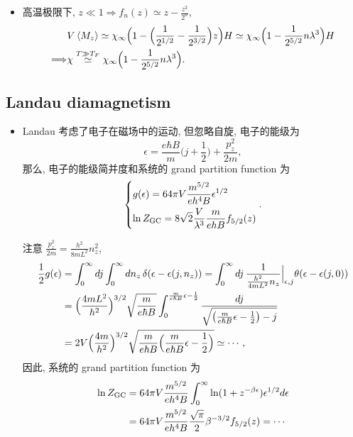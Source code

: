 \begin{itemize}
\begin{itemize}
		\item 高温极限下, $z \ll 1 \Longrightarrow f_n(z) \simeq z - \frac{z^2}{2^n}$,
		\begin{align}
			& V \braket{M_z} \simeq \chi_\infty \Big( 1 - \Big( \frac{1}{2^{1 / 2}} - \frac{1}{2^{3 / 2}} \Big) z \Big) H \simeq \chi_\infty \Big( 1 - \frac{1}{2^{5 / 2}} n \lambda^3 \Big) H \notag \\
			\Longrightarrow & \chi \overset{T \gg T_F}{\simeq} \chi_\infty \Big( 1 - \frac{1}{2^{5 / 2}} n \lambda^3 \Big).
		\end{align}
	\end{itemize}
\end{itemize}

\subsection{Landau diamagnetism}
\begin{itemize}
	\item Landau 考虑了电子在磁场中的运动, 但忽略自旋, 电子的能级为
	\begin{equation}
		\epsilon = \frac{e \hbar B}{m} \Big( j + \frac{1}{2} \Big) + \frac{p_z^2}{2 m},
	\end{equation}
	那么, 电子的能级简并度和系统的 grand partition function 为
	\begin{equation}
		\begin{dcases}
			g(\epsilon) = 64 \pi V \frac{m^{5 / 2}}{e h^4 B} \epsilon^{1 / 2} \\
			\ln Z_\text{GC} = 8 \sqrt{2} \frac{V}{\lambda^3} \frac{m}{e h B} f_{5 / 2}(z)
		\end{dcases}.
	\end{equation}
	
	\begin{tcolorbox}[title=calculation:]
		注意 $\frac{p_z^2}{2 m} = \frac{h^2}{8 m L^2} n_z^2$,
		\begin{align}
			\frac{1}{2} g(\epsilon) &= \int_0^\infty dj \int_0^\infty dn_z \, \delta(\epsilon - \epsilon(j, n_z)) = \int_0^\infty dj \, \frac{1}{\frac{h^2}{4 m L^2} n_z} \Big|_{\epsilon, j} \theta(\epsilon - \epsilon(j, 0)) \notag \\
			&= \Big( \frac{4 m L^2}{h^2} \Big)^{3 / 2} \sqrt{\frac{m}{e \hbar B}} \int_0^{\frac{m}{e \hbar B} \epsilon - \frac{1}{2}} \frac{dj}{\sqrt{\big( \frac{m}{e \hbar B} \epsilon - \frac{1}{2} \big) - j}} \notag \\
			&= 2 V \Big( \frac{4 m}{h^2} \Big)^{3 / 2} \sqrt{\frac{m}{e \hbar B} \Big( \frac{m}{e \hbar B} \epsilon - \frac{1}{2} \Big)} \simeq \cdots,
		\end{align}
		因此, 系统的 grand partition function 为
		\begin{align}
			\ln Z_\text{GC} &=  64 \pi V \frac{m^{5 / 2}}{e h^4 B} \int_0^\infty \ln(1 + z^{- \beta \epsilon}) \epsilon^{1 / 2} d\epsilon \notag \\
			&= 64 \pi V \frac{m^{5 / 2}}{e h^4 B} \frac{\sqrt{\pi}}{2} \beta^{- 3 / 2} f_{5 / 2}(z) = \cdots
		\end{align}
	\end{tcolorbox}
\end{itemize}


